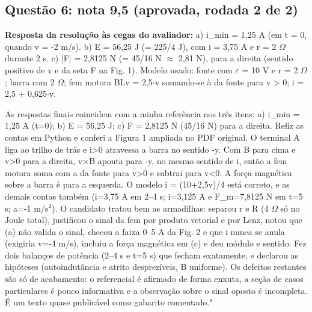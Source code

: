 \documentclass{article}%
\begin{document}
\subsection*{Questão 6: nota 9,5 (aprovada, rodada 2 de 2)}%
\textbf{Resposta da resolução às cegas do avaliador:} a) i\_min = 1,25 A (em t = 0, quando v = -2 m/s).\newline%
b) E = 56,25 J (= 225/4 J), com i = 3,75 A e r = 2 $\Omega$ durante 2 s.\newline%
c) |F| = 2,8125 N (= 45/16 N $\approx$ 2,81 N), para a direita (sentido positivo de v e da seta F na Fig. 1).\newline%
\newline%
Modelo usado: fonte com $\varepsilon$ = 10 V e r = 2 $\Omega$; barra com 2 $\Omega$; fem motora BLv = 2,5$\cdot$v somando{-}se à da fonte para v > 0; i = 2,5 + 0,625$\cdot$v.\par %
As respostas finais coincidem com a minha referência nos três itens: a) i\_min = 1,25 A (t=0); b) E = 56,25 J; c) F = 2,8125 N (45/16 N) para a direita. Refiz as contas em Python e conferi a Figura 1 ampliada no PDF original. O terminal A liga ao trilho de trás e i>0 atravessa a barra no sentido -y. Com B para cima e v>0 para a direita, v$\times$B aponta para -y, no mesmo sentido de i, então a fem motora soma com a da fonte para v>0 e subtrai para v<0. A força magnética sobre a barra é para a esquerda. O modelo i = (10+2,5v)/4 está correto, e as demais contas também (i=3,75 A em 2--4 s; i=3,125 A e F\_m=7,8125 N em t=5 s; a=-1 m/s$^2$). O candidato tratou bem as armadilhas: separou r e R (4 $\Omega$ só no Joule total), justificou o sinal da fem por produto vetorial e por Lenz, notou que (a) não valida o sinal, checou a faixa 0--5 A da Fig. 2 e que i nunca se anula (exigiria v=-4 m/s), incluiu a força magnética em (c) e deu módulo e sentido. Fez dois balanços de potência (2--4 s e t=5 s) que fecham exatamente, e declarou as hipóteses (autoindutância e atrito desprezíveis, B uniforme). Os defeitos restantes são só de acabamento: o referencial é afirmado de forma enxuta, a seção de casos particulares é pouco informativa e a observação sobre o sinal oposto é incompleta. É um texto quase publicável como gabarito comentado."%
\end{document}
